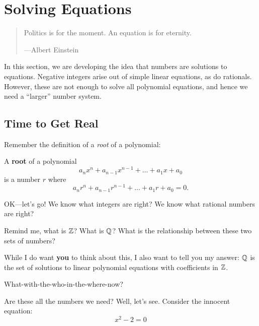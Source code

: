 \chapter{Solving Equations}


\begin{quote}

Politics is for the moment. An equation is for eternity.

\hfill---Albert Einstein
\end{quote}


\begin{teachingnote}
In this section, we are developing the idea that numbers are solutions
to equations. Negative integers arise out of simple linear equations,
as do rationals. However, these are not enough to solve all polynomial
equations, and hence we need a ``larger'' number system.
\end{teachingnote}


\section{Time to Get Real}

Remember the definition of a \textit{root} of a polynomial:

\begin{definition} A \textbf{root} of a polynomial 
\[
a_nx^n + a_{n-1}x^{n-1} + \dots + a_1 x + a_0
\]
is a number $r$ where
\[
a_nr^n + a_{n-1}r^{n-1} + \dots + a_1 r + a_0 = 0.
\]
\end{definition}


OK---let's go! We know what integers are right? We know what rational
numbers are right?

\begin{question}
Remind me, what is $\mathbb Z$? What is $\mathbb Q$? What is the relationship between
these two sets of numbers?
\end{question}
While I do want \textbf{you} to think about this, I also want to tell
you my answer: $\mathbb Q$ is the set of solutions to linear polynomial
equations with coefficients in $\mathbb Z$.

\begin{question}
What-with-the-who-in-the-where-now?
\end{question}
\QM

Are these all the numbers we need? Well, let's see. Consider the
innocent equation:
\[
x^2 -2 = 0
\]

